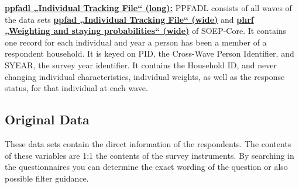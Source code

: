 \documentclass[letterpaper,10pt,openany,onesideH,english]{sphinxmanual}
\begin{document}
 \href{https://paneldata.org/soep-long/data/ppfadl}{\textbf{ppfadl „Individual Tracking File“ (long):}} PPFADL consists of all waves of the data sets  \href{https://paneldata.org/soep-core/data/ppfad}{\textbf{ppfad „Individual Tracking File“ (wide)}} and  \href{https://paneldata.org/soep-core/data/phrf}{\textbf{phrf „Weighting and staying probabilities“ (wide)}} of SOEP-Core. It contains one record for each individual and year a person has been a member of a respondent household. It is keyed on PID, the Cross-Wave Person Identifier, and SYEAR, the survey year identifier. It contains the Household ID, and never changing individual characteristics, individual weights, as well as the response status, for that individual at each wave.


\subsection{Original Data}
\label{\detokenize{Principles of Data Structure/index:original-data}}
These data sets contain the direct information of the respondents. The contents of these variables are 1:1 the contents of the survey instruments. By searching in the questionnaires you can determine the exact wording of the question or also possible filter guidance.
\end{document}

